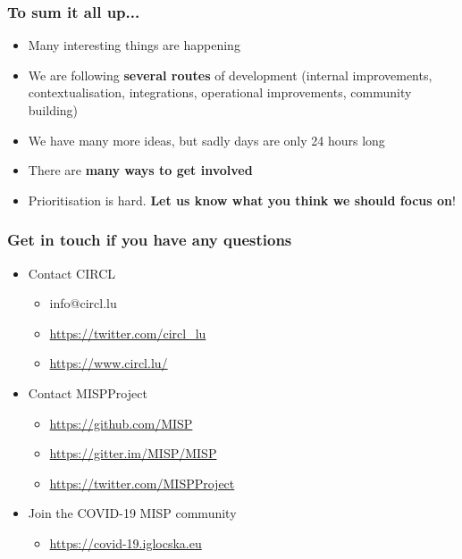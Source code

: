 \begin{frame}
  \frametitle{To sum it all up...}
  \begin{itemize}
     \item Many interesting things are happening
     \item We are following {\bf several routes} of development (internal improvements, contextualisation, integrations, operational improvements, community building)
     \item We have many more ideas, but sadly days are only 24 hours long
     \item There are {\bf many ways to get involved}
     \item Prioritisation is hard. {\bf Let us know what you think we should focus on}!
  \end{itemize}
\end{frame}

\begin{frame}
  \frametitle{Get in touch if you have any questions}
  \begin{itemize}
    \item Contact CIRCL
    \begin{itemize}
      \item info@circl.lu
      \item \url{https://twitter.com/circl_lu}
      \item \url{https://www.circl.lu/}
    \end{itemize}
    \item Contact MISPProject 
    \begin{itemize}
      \item \url{https://github.com/MISP}
      \item \url{https://gitter.im/MISP/MISP}
      \item \url{https://twitter.com/MISPProject}
    \end{itemize}
    \item Join the COVID-19 MISP community
    \begin{itemize}
      \item \url{https://covid-19.iglocska.eu}
    \end{itemize}
  \end{itemize}
\end{frame}
